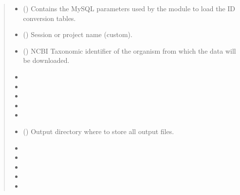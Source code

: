 \documentclass[letterpaper,10pt,english]{sphinxmanual}
\begin{document}
\begin{fulllineitems}
\begin{quote}
\begin{description}
\begin{itemize}
\item {} 
 () \textendash{} Contains the MySQL parameters used by the
 module to load the ID conversion
tables.

\item {} 
 () \textendash{} Session or project name (custom).

\item {} 
 () \textendash{} NCBI Taxonomic identifier of the organism from which the data
will be downloaded.

\item {} 
 \textendash{} 

\item {} 
 \textendash{} 

\item {} 
 \textendash{} 

\item {} 
 \textendash{} 

\item {} 
 \textendash{} 

\item {} 
 () \textendash{} Output directory where to store all output files.

\item {} 
 \textendash{} 

\item {} 
 \textendash{} 

\item {} 
 \textendash{} 

\item {} 
 \textendash{} 

\item {} 
 \textendash{} 


\end{itemize}
\end{description}
\end{quote}
\end{fulllineitems}
\end{document}
